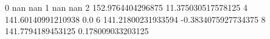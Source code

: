 0 nan nan
1 nan nan
2 152.9764404296875 11.375030517578125
4 141.60140991210938 0.0
6 141.21800231933594 -0.3834075927734375
8 141.7794189453125 0.178009033203125
